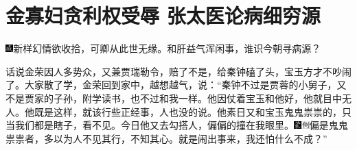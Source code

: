 

\chapter{金寡妇贪利权受辱 张太医论病细穷源}

{\includegraphics[width=3mm]{../Images/00005}新样幻情欲收拾，可卿从此世无缘。和肝益气浑闲事，谁识今朝寻病源？}

话说金荣因人多势众，又兼贾瑞勒令，赔了不是，给秦钟磕了头，宝玉方才不吵闹了。大家散了学，金荣回到家中，越想越气，说：``秦钟不过是贾蓉的小舅子，又不是贾家的子孙，附学读书，也不过和我一样。他因仗着宝玉和他好，他就目中无人。他既是这样，就该行些正经事，人也没的说。他素日又和宝玉鬼鬼祟祟的，只当我们都是瞎子，看不见。今日他又去勾搭人，偏偏的撞在我眼里。{\includegraphics[width=3mm]{../Images/00006}\includegraphics[width=3mm]{../Images/00011}\footnotesize \kaishu 偏是鬼鬼祟祟者，多以为人不见其行，不知其心。}就是闹出事来，我还怕什么不成？''

